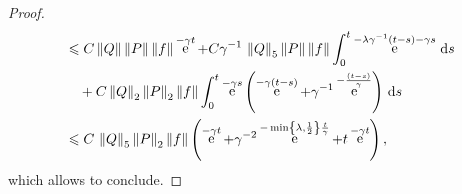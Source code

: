 \documentclass[11pt,a4paper]{article}
\DeclareMathOperator{\e}{e}
\renewcommand{\d}{\mathrm d}
\theoremstyle{plain}
\numberwithin{equation}{section}
\renewcommand{\leq}{\leqslant}
\begin{document}
\begin{proof}
\begin{align*}
        &\leq C \norm{Q} \norm{P} \norm{f} \e^{-\gamma t}
        + C \gamma^{-1} \, \norm{Q}_5  \norm{P} \norm{f} \int_{0}^{t}  \e^{-\lambda \gamma^{-1} (t-s) - \gamma s} \, \d s \\
        &\quad+ C \norm{Q}_2 \norm{P}_2 \norm{f} \int_{0}^t \e^{-\gamma s}\left(\e^{-\gamma (t-s)} + \gamma^{-1} \e^{-\frac{(t-s)}{\gamma}} \right) \, \d s \\
        &\leq C \, \norm{Q}_5  \norm{P}_2 \norm{f}
        \left( \e^{-\gamma t} +  \gamma^{-2} \e^{-\min\left\{\lambda, \frac{1}{2}\right\} \frac{t}{\gamma}} + t\e^{-\gamma t} \right),
    \end{align*}
    which allows to conclude.
\end{proof}








\end{document}
